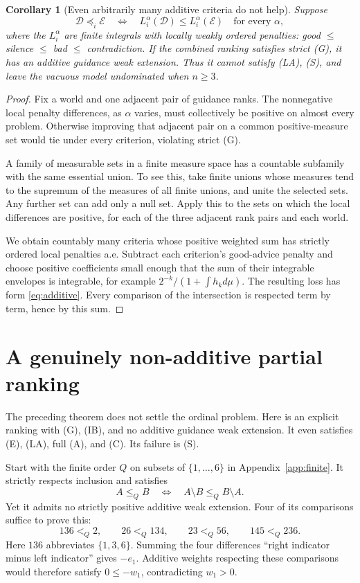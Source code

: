 \documentclass[11pt]{article}
\newtheorem{corollary}[theorem]{Corollary}
\theoremstyle{remark}\newtheorem{remark}[theorem]{Remark}
\newcommand{\Dscr}{\mathcal D}
\newcommand{\Escr}{\mathcal E}
\begin{document}
\begin{corollary}[Even arbitrarily many additive criteria do not help]
Suppose
\[
 \Dscr\preceq_i\Escr\quad\Longleftrightarrow\quad
 L_i^\alpha(\Dscr)\le L_i^\alpha(\Escr)\quad\text{for every }\alpha,
\]
where the $L_i^\alpha$ are finite integrals with locally weakly ordered
penalties: good $\le$ silence $\le$ bad $\le$ contradiction.
If the combined ranking satisfies strict (G), it has an additive guidance
weak extension. Thus it cannot satisfy (LA), (S), and leave the vacuous
model undominated when $n\ge3$.
\end{corollary}
\begin{proof}
Fix a world and one adjacent pair of guidance ranks. The nonnegative local
penalty differences, as $\alpha$ varies, must collectively be positive on
almost every problem. Otherwise improving that adjacent pair on a common
positive-measure set would tie under every criterion, violating strict (G).

A family of measurable sets in a finite measure space has a countable
subfamily with the same essential union. To see this, take finite unions
whose measures tend to the supremum of the measures of all finite unions,
and unite the selected sets. Any further set can add only a null set.
Apply this to the sets on which the local differences are positive, for
each of the three adjacent rank pairs and each world.

We obtain countably many criteria whose positive weighted sum has strictly
ordered local penalties a.e. Subtract each criterion's good-advice penalty
and choose positive coefficients small enough that the sum of their
integrable envelopes is integrable, for example $2^{-k}/(1+\int h_kd\mu)$.
The resulting loss has form \eqref{eq:additive}. Every comparison of the
intersection is respected term by term, hence by this sum.
\end{proof}

\section{A genuinely non-additive partial ranking}

The preceding theorem does not settle the ordinal problem. Here is an
explicit ranking with (G), (IB), and no additive guidance weak extension.
It even satisfies (E), (LA), full (A), and (C). Its failure is (S).

Start with the finite order $Q$ on subsets of $\{1,\ldots,6\}$ in
Appendix~\ref{app:finite}. It strictly respects inclusion and satisfies
\begin{equation}
 A\le_Q B\quad\Longleftrightarrow\quad A\setminus B\le_Q B\setminus A.
 \label{eq:finite-cancellation}
\end{equation}
Yet it admits no strictly positive additive weak extension. Four of its
comparisons suffice to prove this:
\begin{equation}
 136<_Q2,\qquad26<_Q134,\qquad23<_Q56,\qquad145<_Q236.
 \label{eq:four-witness}
\end{equation}
Here $136$ abbreviates $\{1,3,6\}$. Summing the four differences
``right indicator minus left indicator'' gives $-e_1$.
Additive weights respecting these comparisons would therefore satisfy
$0\le-w_1$, contradicting $w_1>0$.
\end{document}
